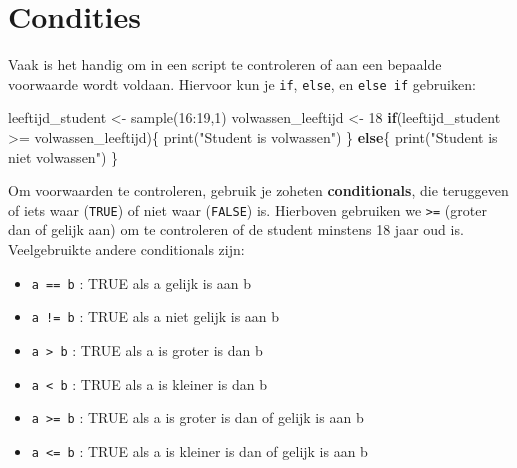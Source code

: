 \documentclass[
  b5paper,
  DIV=11,
  numbers=noendperiod]{scrreprt}
\newenvironment{Shaded}{\begin{snugshade}}{\end{snugshade}}
\newcommand{\ControlFlowTok}[1]{\textcolor[rgb]{0.00,0.23,0.31}{\textbf{#1}}}
\newcommand{\DecValTok}[1]{\textcolor[rgb]{0.68,0.00,0.00}{#1}}
\newcommand{\FunctionTok}[1]{\textcolor[rgb]{0.28,0.35,0.67}{#1}}
\newcommand{\NormalTok}[1]{\textcolor[rgb]{0.00,0.23,0.31}{#1}}
\newcommand{\OtherTok}[1]{\textcolor[rgb]{0.00,0.23,0.31}{#1}}
\newcommand{\SpecialCharTok}[1]{\textcolor[rgb]{0.37,0.37,0.37}{#1}}
\newcommand{\StringTok}[1]{\textcolor[rgb]{0.13,0.47,0.30}{#1}}
\providecommand{\tightlist}{%
  \setlength{\itemsep}{0pt}\setlength{\parskip}{0pt}}\usepackage{longtable,booktabs,array}
\theoremstyle{definition}
\theoremstyle{remark}
\begin{document}
\section{Condities}\label{condities}

Vaak is het handig om in een script te controleren of aan een bepaalde
voorwaarde wordt voldaan. Hiervoor kun je \texttt{if}, \texttt{else}, en
\texttt{else\ if} gebruiken:

\begin{Shaded}
\begin{Highlighting}[]
\NormalTok{leeftijd\_student }\OtherTok{\textless{}{-}} \FunctionTok{sample}\NormalTok{(}\DecValTok{16}\SpecialCharTok{:}\DecValTok{19}\NormalTok{,}\DecValTok{1}\NormalTok{)}
\NormalTok{volwassen\_leeftijd }\OtherTok{\textless{}{-}} \DecValTok{18}
\ControlFlowTok{if}\NormalTok{(leeftijd\_student }\SpecialCharTok{\textgreater{}=}\NormalTok{ volwassen\_leeftijd)\{}
  \FunctionTok{print}\NormalTok{(}\StringTok{"Student is volwassen"}\NormalTok{)}
\NormalTok{\} }\ControlFlowTok{else}\NormalTok{\{}
  \FunctionTok{print}\NormalTok{(}\StringTok{"Student is niet volwassen"}\NormalTok{)}
\NormalTok{\}}
\end{Highlighting}
\end{Shaded}

Om voorwaarden te controleren, gebruik je zoheten \textbf{conditionals},
die teruggeven of iets waar (\texttt{TRUE}) of niet waar
(\texttt{FALSE}) is. Hierboven gebruiken we \texttt{\textgreater{}=}
(groter dan of gelijk aan) om te controleren of de student minstens 18
jaar oud is. Veelgebruikte andere conditionals zijn:

\begin{itemize}
\tightlist
\item
  \texttt{a\ ==\ b} : TRUE als a gelijk is aan b
\end{itemize}

\begin{itemize}
\item
  \texttt{a\ !=\ b} : TRUE als a niet gelijk is aan b
\item
  \texttt{a\ \textgreater{}\ b} : TRUE als a is groter is dan b
\item
  \texttt{a\ \textless{}\ b} : TRUE als a is kleiner is dan b
\item
  \texttt{a\ \textgreater{}=\ b} : TRUE als a is groter is dan of gelijk
  is aan b
\item
  \texttt{a\ \textless{}=\ b} : TRUE als a is kleiner is dan of gelijk
  is aan b
\end{itemize}
\end{document}
